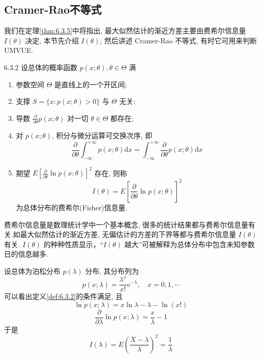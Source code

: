 \subsection{Cramer-Rao不等式}\label{ssec:6.3.3}

我们在定理\ref{thm:6.3.5}中将指出, 最大似然估计的渐近方差主要由费希尔信息量 $I(\theta)$ 决定, 本节先介绍 $I(\theta)$, 然后讲述 Cramer-Rao 不等式, 有时它可用来判断UMVUE.

\begin{definition}{}{6.3.2}
设总体的概率函数 $p(x ; \theta), \theta \in \Theta$ 满
\begin{enumerate}
\item 参数空间 $\Theta$ 是直线上的一个开区间;
\item 支撑 $S=\{x : p(x ; \theta)>0 \}$ 与 $\Theta$ 无关;
\item 导数 $\frac{\partial}{\partial \theta} p(x ; \theta)$ 对一切 $\theta\in\Theta$ 都存在;
\item 对 $p(x ; \theta)$, 积分与微分运算可交换次序, 即
\[\frac{\partial}{\partial \theta} \int_{-\infty}^{+\infty} p(x ; \theta) \mathrm{d} x=\int_{-\infty}^{+\infty} \frac{\partial}{\partial \theta} p(x ; \theta) \mathrm{d} x\]
\item 期望 $E\left[\frac{\partial}{\partial \theta} \ln p(x ; \theta)\right]^{2}$ 存在, 则称
\begin{equation}\label{eq:6.3.7}
I(\theta)=E\left[\frac{\partial}{\partial \theta} \ln p(x ; \theta)\right]^{2}
\end{equation}
为总体分布的费希尔(Fisher)信息量.	
\end{enumerate}
\end{definition}

费希尔信息量是数理统计学中一个基本概念, 很多的统计结果都与费希尔信息量有关.如最大似然估计的渐近方差, 无偏估计的方差的下界等都与费希尔信息量 $I(\theta)$ 有关. $I(\theta)$ 的种种性质显示，“$I(\theta)$ 越大”可被解释为总体分布中包含未知参数日的信息越多.

\begin{example}\label{exam:6.3.3}
设总体为泊松分布 $p(\lambda)$ 分布, 其分布列为
\[p(x ; \lambda)=\frac{\lambda^{x}}{x !} \mathrm{e}^{-\lambda}, \quad x=0,1, \cdots\]
可以看出定义\ref{def:6.3.2}的条件满足, 且
\[\ln p(x ; \lambda)=x \ln \lambda-\lambda-\ln (x !)\]
\[\frac{\partial}{\partial \lambda} \ln p(x ; \lambda)=\frac{x}{\lambda}-1\]
于是
\[I(\lambda)=E\left(\frac{X-\lambda}{\lambda}\right)^{2}=\frac{1}{\lambda}\]
\end{example}

